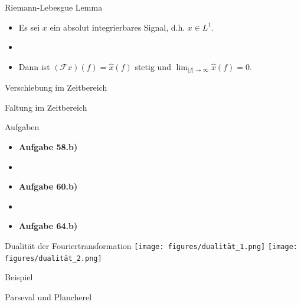 \documentclass[14pt, aspectratio=169, handout]{beamer}
\begin{document}
\begin{frame}{Riemann-Lebesgue Lemma}
    \begin{itemize}
        \item Es sei $x$ ein absolut integrierbares Signal, d.h. $x \in L^1$.
        \item[] 
        \item[]  Dann ist $(\mathcal{F}x)(f) = \hat{x}(f)$ stetig und $\displaystyle\lim_{|f| \to \infty} \hat{x}(f) = 0$.
    \end{itemize}
\end{frame}

\begin{frame}{Verschiebung im Zeitbereich}
    
\end{frame}

\begin{frame}{Faltung im Zeitbereich}
    
\end{frame}

\begin{frame}{Aufgaben}
    \begin{itemize}
        \item \textbf{Aufgabe 58.b)}
        \item[] 
        \item \textbf{Aufgabe 60.b)}
        \item[] 
        \item \textbf{Aufgabe 64.b)}
    \end{itemize}
\end{frame}

\begin{frame}{Dualität der Fouriertransformation}
    \texttt{[image: figures/dualität\_1.png]}
    \texttt{[image: figures/dualität\_2.png]}
\end{frame}

\begin{frame}{Beispiel}
    
\end{frame}

\begin{frame}{Parseval und Plancherel}
\end{frame}
\end{document}
